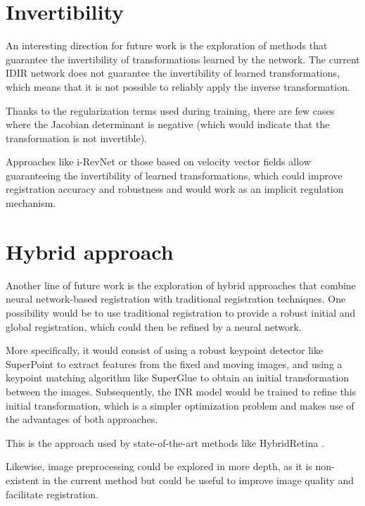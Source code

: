 \section{Invertibility}
\label{sec:Invertibilidade}

An interesting direction for future work is the exploration of methods that guarantee the invertibility of transformations learned by the network.
The current IDIR network does not guarantee the invertibility of learned transformations, which means that it is not possible to reliably apply the inverse transformation.

Thanks to the regularization terms used during training, there are few cases where the Jacobian determinant is negative (which would indicate that the transformation is not invertible).

Approaches like i-RevNet \cite{jacobsen2018irevnetdeepinvertiblenetworks} or those based on velocity vector fields \cite{sun2024medicalimageregistrationneural} allow guaranteeing the invertibility of learned transformations, which could improve registration accuracy and robustness and would work as an implicit regulation mechanism.

\section{Hybrid approach}
\label{sec:Enfoque híbrido}

Another line of future work is the exploration of hybrid approaches that combine neural network-based registration with traditional registration techniques.
One possibility would be to use traditional registration to provide a robust initial and global registration, which could then be refined by a neural network.

More specifically, it would consist of using a robust keypoint detector like SuperPoint \cite{superpoint} to extract features from the fixed and moving images, and using a keypoint matching algorithm like SuperGlue \cite{superglue} to obtain an initial transformation between the images.
Subsequently, the INR model would be trained to refine this initial transformation, which is a simpler optimization problem and makes use of the advantages of both approaches.

This is the approach used by state-of-the-art methods like HybridRetina \cite{liu2024progressiveretinalimageregistration}.

Likewise, image preprocessing could be explored in more depth, as it is non-existent in the current method but could be useful to improve image quality and facilitate registration.